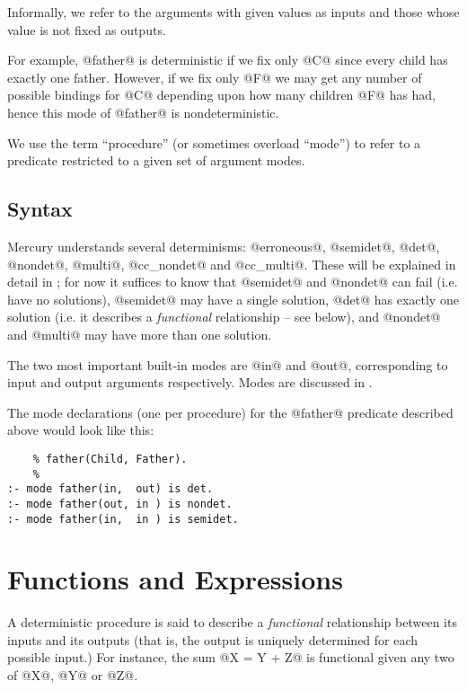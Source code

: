 Informally, we refer to the arguments with given values as inputs and
those whose value is not fixed as outputs.

For example, @father@ is deterministic if we fix only @C@ since every child
has exactly one father.  However, if we fix only @F@ we may get any
number of possible bindings for @C@ depending upon how many children @F@
has had, hence this mode of @father@ is nondeterministic.

We use the term ``procedure'' (or sometimes overload ``mode'') to refer
to a predicate restricted to a given set of argument modes.

\subsection{Syntax}

Mercury understands several determinisms: @erroneous@, @semidet@, @det@,
@nondet@, @multi@, @cc_nondet@ and @cc_multi@.  These will be explained
in detail in \XXX{}; for now it suffices to know that @semidet@ and
@nondet@ can fail (i.e. have no solutions), @semidet@ may have a single
solution, @det@ has exactly one solution (i.e. it describes a
\emph{functional} relationship -- see below), and @nondet@ and @multi@
may have more than one solution.

The two most important built-in modes are @in@ and @out@, corresponding
to input and output arguments respectively.  Modes are discussed in
\XXX{}.

The mode declarations (one per procedure) for the @father@ predicate
described above would look like this:
\begin{verbatim}
    % father(Child, Father).
    %
:- mode father(in,  out) is det.
:- mode father(out, in ) is nondet.
:- mode father(in,  in ) is semidet.
\end{verbatim}




\section{Functions and Expressions}

A deterministic procedure is said to describe a \emph{functional}
relationship between its inputs and its outputs (that is, the output is
uniquely determined for each possible input.)  For instance, the
sum @X = Y + Z@ is functional given any two of @X@, @Y@ or @Z@.

